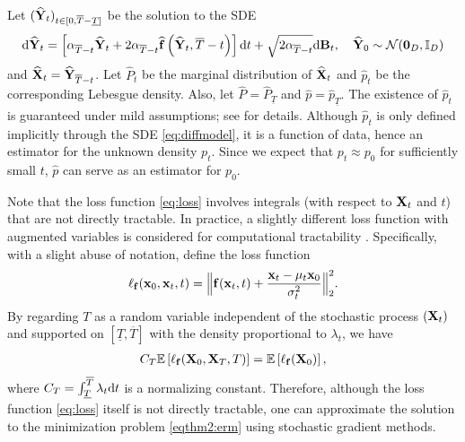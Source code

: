 \documentclass[twoside,11pt]{article}
\def\cN{\mathcal N}
\newcommand{\bB}{{\bf B}}
\newcommand{\bff}{{\bf f}}
\newcommand{\bx}{{\bf x}}
\newcommand{\bX}{{\bf X}}
\newcommand{\bY}{{\bf Y}}
\newcommand{\bbI}{{\mathbb I}}
\newcommand{\E}{\mathbb{E}}
\newcommand{\be}{\begin{equation}}
\newcommand{\ee}{\end{equation}}
\newcommand{\bean}{\setlength\arraycolsep{1pt}\begin{eqnarray*}}
\newcommand{\eean}{\end{eqnarray*}}
\def\d{{\rm d}}
\begin{document}
Let $(\widehat \bY_{t})_{t \in [0, \overline{T}-\underline{T}]}$ be the solution to the SDE
\be
\d \widehat \bY_t = \left[\alpha_{\overline{T}-t} \widehat \bY_t + 2 \alpha_{\overline{T}-t} \widehat \bff \left(\widehat \bY_t,\overline{T}-t \right) \right] \d t + \sqrt{2\alpha_{\overline{T}-t}} \d \bB_t,\quad \widehat \bY_0 \sim \cN(\mathbf{0}_{D}, \bbI_{D})
\label{eq:diffmodel}
\ee
and $\widehat\bX_t = \widehat\bY_{\overline{T} - t}$.
Let $\widehat P_{t}$ be the marginal distribution of $\widehat \bX_{t}$ and $\widehat p_t$ be the corresponding Lebesgue density.
Also, let $\widehat P = \widehat P_{\underline{T}}$ and $\widehat p = \widehat p_{\underline{T}}$.
The existence of $\widehat p_t$ is guaranteed under mild assumptions; see \citet{bogachev2011uniqueness} for details.
Although $\widehat p_t$ is only defined implicitly through the SDE \eqref{eq:diffmodel}, it is a function of data, hence an estimator for the unknown density $p_t$.
Since we expect that $p_t \approx p_0$ for sufficiently small $t$, $\widehat p$ can serve as an estimator for $p_0$.



\begin{remark}
Note that the loss function \eqref{eq:loss} involves integrals (with respect to $\bX_t$ and $t$) that are not directly tractable.
In practice, a slightly different loss function with augmented variables is considered for computational tractability \citep{sohl2015deep, song2019generative}. Specifically, with a slight abuse of notation, define the loss function
\bean
 \ell_{\bff}(\bx_0, \bx_t, t) = \Big\| \bff(\bx_{t}, t) + \frac{\bx_t - \mu_t \bx_0}{\sigma_t^2} \Big\|_2^2.
\eean
By regarding $T$ as a random variable independent of the stochastic process $(\bX_t)$ and supported on $[\underline{T}, \overline{T}]$ with the density proportional to $\lambda_t$, we have
\bean
C_{T}
 \E  \left[ \ell_{\bff}(\bX_0, \bX_T, T) \right]
 = \E \left[ \ell_{\bff} (\bX_0) \right],
\eean
where $ C_{T} =  \int_{\underline{T}}^{\overline{T}} \lambda_t \d t$ is a normalizing constant.
Therefore, although the loss function \eqref{eq:loss} itself is not directly tractable, one can approximate the solution to the minimization problem \eqref{eqthm2:erm} using stochastic gradient methods.
\end{remark}
\end{document}
